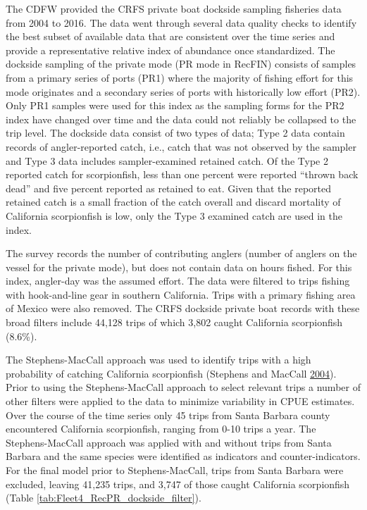 \documentclass[12pt,]{article}
\begin{document}
The CDFW provided the CRFS private boat dockside sampling fisheries data
from 2004 to 2016. The data went through several data quality checks to
identify the best subset of available data that are consistent over the
time series and provide a representative relative index of abundance
once standardized. The dockside sampling of the private mode (PR mode in
RecFIN) consists of samples from a primary series of ports (PR1) where
the majority of fishing effort for this mode originates and a secondary
series of ports with historically low effort (PR2). Only PR1 samples
were used for this index as the sampling forms for the PR2 index have
changed over time and the data could not reliably be collapsed to the
trip level. The dockside data consist of two types of data; Type 2 data
contain records of angler-reported catch, i.e., catch that was not
observed by the sampler and Type 3 data includes sampler-examined
retained catch. Of the Type 2 reported catch for scorpionfish, less than
one percent were reported ``thrown back dead'' and five percent reported
as retained to eat. Given that the reported retained catch is a small
fraction of the catch overall and discard mortality of California
scorpionfish is low, only the Type 3 examined catch are used in the
index.

The survey records the number of contributing anglers (number of anglers
on the vessel for the private mode), but does not contain data on hours
fished. For this index, angler-day was the assumed effort. The data were
filtered to trips fishing with hook-and-line gear in southern
California. Trips with a primary fishing area of Mexico were also
removed. The CRFS dockside private boat records with these broad filters
include 44,128 trips of which 3,802 caught California scorpionfish
(8.6\%).

The Stephens-MacCall approach was used to identify trips with a high
probability of catching California scorpionfish (Stephens and MacCall
\protect\hyperlink{ref-Stephens2004}{2004}). Prior to using the
Stephens-MacCall approach to select relevant trips a number of other
filters were applied to the data to minimize variability in CPUE
estimates. Over the course of the time series only 45 trips from Santa
Barbara county encountered California scorpionfish, ranging from 0-10
trips a year. The Stephens-MacCall approach was applied with and without
trips from Santa Barbara and the same species were identified as
indicators and counter-indicators. For the final model prior to
Stephens-MacCall, trips from Santa Barbara were excluded, leaving 41,235
trips, and 3,747 of those caught California scorpionfish (Table
\ref{tab:Fleet4_RecPR_dockside_filter}).
\end{document}
